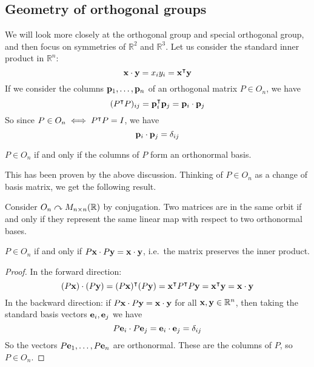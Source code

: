 \subsection{Geometry of orthogonal groups}
We will look more closely at the orthogonal group and special orthogonal group, and then focus on symmetries of \(\mathbb R^2\) and \(\mathbb R^3\).
Let us consider the standard inner product in \(\mathbb R^n\):
\[
	\vb x \cdot \vb y = x_i y_i = \vb x^\intercal \vb y
\]
If we consider the columns \(\vb p_1, \dots, \vb p_n\) of an orthogonal matrix \(P \in O_n\), we have
\[
	(P^\intercal P)_{ij} = \vb p_i^\intercal \vb p_j = \vb p_i \cdot \vb p_j
\]
So since \(P \in O_n \iff P^\intercal P = I\), we have
\[
	\vb p_i \cdot \vb p_j = \delta_{ij}
\]
\begin{proposition}
	\(P \in O_n\) if and only if the columns of \(P\) form an orthonormal basis.
\end{proposition}
This has been proven by the above discussion.
Thinking of \(P \in O_n\) as a change of basis matrix, we get the following result.
\begin{proposition}
	Consider \(O_n \curvearrowright M_{n \times n}(\mathbb R)\) by conjugation.
	Two matrices are in the same orbit if and only if they represent the same linear map with respect to two orthonormal bases.
\end{proposition}
\begin{proposition}
	\(P \in O_n\) if and only if \(P \vb x \cdot P \vb y = \vb x \cdot \vb y\), i.e.\ the matrix preserves the inner product.
\end{proposition}
\begin{proof}
	In the forward direction:
	\[
		(P\vb x) \cdot (P \vb y) = (P \vb x)^\intercal (P \vb y) = \vb x^\intercal P^\intercal P \vb y = \vb x^\intercal \vb y = \vb x \cdot \vb y
	\]
	In the backward direction: if \(P\vb x \cdot P\vb y = \vb x \cdot \vb y\) for all \(\vb x, \vb y \in \mathbb R^n\), then taking the standard basis vectors \(\vb e_i, \vb e_j\) we have
	\[
		P\vb e_i \cdot P\vb e_j = \vb e_i \cdot \vb e_j = \delta_{ij}
	\]
	So the vectors \(P\vb e_1, \dots, P\vb e_n\) are orthonormal.
	These are the columns of \(P\), so \(P \in O_n\).
\end{proof}

